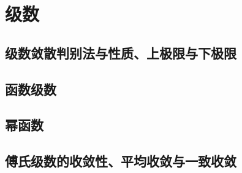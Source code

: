 \chapter{级数}
\section{级数敛散判别法与性质、上极限与下极限}

\section{函数级数}

\section{幂函数}

\section{傅氏级数的收敛性、平均收敛与一致收敛}